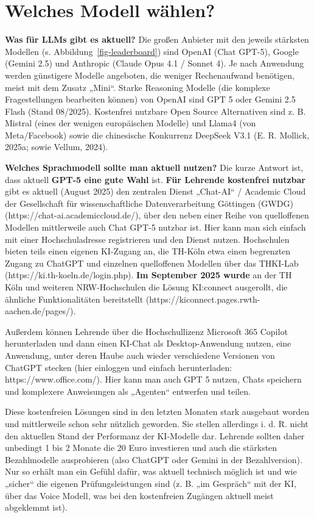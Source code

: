 \documentclass[
  ngerman,
  letterpaper,
  DIV=11]{scrreprt}
\begin{document}
\section{Welches Modell wählen?}\label{sec-model-choice}

\textbf{Was für LLMs gibt es aktuell?} Die großen Anbieter mit den
jeweils stärksten Modellen (s. Abbildung~\ref{fig-leaderboard}) sind
OpenAI (Chat GPT-5), Google (Gemini 2.5) und Anthropic (Claude Opus 4.1
/ Sonnet 4). Je nach Anwendung werden günstigere Modelle angeboten, die
weniger Rechenaufwand benötigen, meist mit dem Zusatz „Mini``. Starke
Reasoning Modelle (die komplexe Fragestellungen bearbeiten können) von
OpenAI sind GPT 5 oder Gemini 2.5 Flash (Stand 08/2025). Kostenfrei
nutzbare Open Source Alternativen sind z. B. Mistral (eines der wenigen
europäischen Modelle) und Llama4 (von Meta/Facebook) sowie die
chinesische Konkurrenz DeepSeek V3.1 (E. R. Mollick, 2025a; sowie
Vellum, 2024).

\textbf{Welches Sprachmodell sollte man aktuell nutzen?} Die kurze
Antwort ist, dass aktuell \textbf{GPT-5 eine gute Wahl} ist. \textbf{Für
Lehrende kostenfrei nutzbar} gibt es aktuell (August 2025) den zentralen
Dienst „Chat-AI`` / Academic Cloud der Gesellschaft für
wissenschaftliche Datenverarbeitung Göttingen (GWDG)
(https://chat-ai.academiccloud.de/), über den neben einer Reihe von
quelloffenen Modellen mittlerweile auch Chat GPT-5 nutzbar ist. Hier
kann man sich einfach mit einer Hochschuladresse registrieren und den
Dienst nutzen. Hochschulen bieten teils einen eigenen KI-Zugang an, die
TH-Köln etwa einen begrenzten Zugang zu ChatGPT und einzelnen
quelloffenen Modellen über das THKI-Lab
(https://ki.th-koeln.de/login.php). \textbf{Im September 2025 wurde} an
der TH Köln und weiteren NRW-Hochschulen die Lösung KI:connect
ausgerollt, die ähnliche Funktionalitäten bereitstellt
(https://kiconnect.pages.rwth-aachen.de/pages/).

Außerdem können Lehrende über die Hochschullizenz Microsoft 365 Copilot
herunterladen und dann einen KI-Chat als Desktop-Anwendung nutzen, eine
Anwendung, unter deren Haube auch wieder verschiedene Versionen von
ChatGPT stecken (hier einloggen und einfach herunterladen:
https://www.office.com/). Hier kann man auch GPT 5 nutzen, Chats
speichern und komplexere Anweisungen als „Agenten`` entwerfen und
teilen.

Diese kostenfreien Lösungen sind in den letzten Monaten stark ausgebaut
worden und mittlerweile schon sehr nützlich geworden. Sie stellen
allerdings i. d. R. nicht den aktuellen Stand der Performanz der
KI-Modelle dar. Lehrende sollten daher unbedingt 1 bis 2 Monate die 20
Euro investieren und auch die stärksten Bezahlmodelle ausprobieren (also
ChatGPT oder Gemini in der Bezahlversion). Nur so erhält man ein Gefühl
dafür, was aktuell technisch möglich ist und wie „sicher`` die eigenen
Prüfungsleistungen sind (z. B. „im Gespräch`` mit der KI, über das Voice
Modell, was bei den kostenfreien Zugängen aktuell meist abgeklemmt ist).
\end{document}
